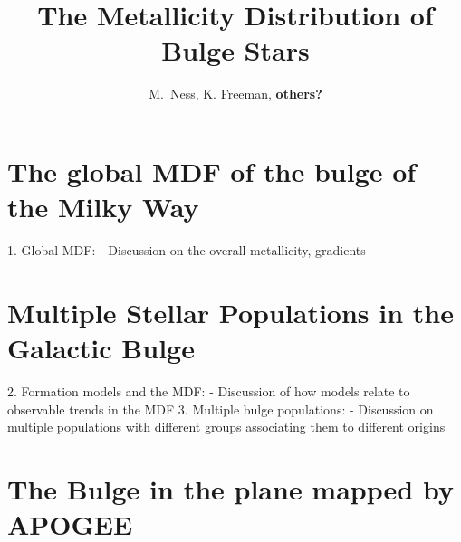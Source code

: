 \documentclass[12pt, preprint]{aastex}
\begin{document}
\title{The Metallicity Distribution of Bulge Stars}
\author{M.~Ness,
K. Freeman,
\textbf{others?}}


\begin{abstract}%

\end{abstract}


\section{The global MDF of the bulge of the Milky Way} 
1. Global MDF: - Discussion on the overall metallicity, gradients \\

\section{Multiple Stellar Populations in the Galactic Bulge} 


2. Formation models and the MDF: - Discussion of how models relate to observable
trends in the MDF
3. Multiple bulge populations: - Discussion on multiple populations with different
groups associating them to different origins

\section{The Bulge in the plane mapped by APOGEE}
\end{document}
